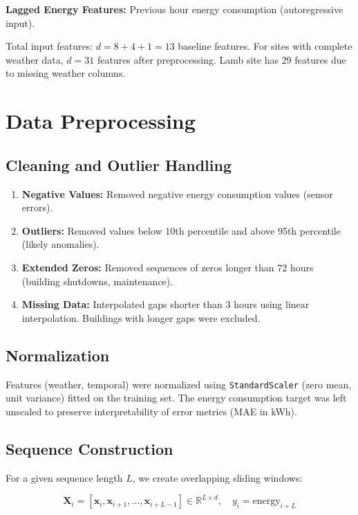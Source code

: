 \documentclass[12pt,a4paper]{report}
\newcommand{\R}{\mathbb{R}}
\begin{document}
\textbf{Lagged Energy Features:} Previous hour energy consumption (autoregressive input).

Total input features: \(d = 8 + 4 + 1 = 13\) baseline features. For sites with complete weather data, \(d = 31\) features after preprocessing. Lamb site has 29 features due to missing weather columns.

\section{Data Preprocessing}

\subsection{Cleaning and Outlier Handling}

\begin{enumerate}
    \item \textbf{Negative Values:} Removed negative energy consumption values (sensor errors).
    \item \textbf{Outliers:} Removed values below 10th percentile and above 95th percentile (likely anomalies).
    \item \textbf{Extended Zeros:} Removed sequences of zeros longer than 72 hours (building shutdowns, maintenance).
    \item \textbf{Missing Data:} Interpolated gaps shorter than 3 hours using linear interpolation. Buildings with longer gaps were excluded.
\end{enumerate}

\subsection{Normalization}

Features (weather, temporal) were normalized using \texttt{StandardScaler} (zero mean, unit variance) fitted on the training set. The energy consumption target was left unscaled to preserve interpretability of error metrics (MAE in kWh).

\subsection{Sequence Construction}

For a given sequence length \(L\), we create overlapping sliding windows:

\[
\mathbf{X}_i = [\mathbf{x}_{i}, \mathbf{x}_{i+1}, \ldots, \mathbf{x}_{i+L-1}] \in \R^{L \times d}, \quad y_i = \text{energy}_{i+L}
\]
\end{document}
